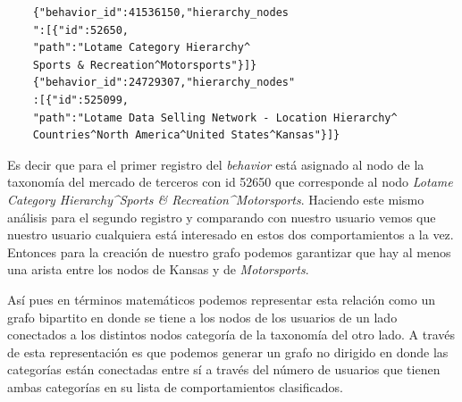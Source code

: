 \begin{verbatim}
    {"behavior_id":41536150,"hierarchy_nodes
    ":[{"id":52650,
    "path":"Lotame Category Hierarchy^
    Sports & Recreation^Motorsports"}]}
    {"behavior_id":24729307,"hierarchy_nodes"
    :[{"id":525099,
    "path":"Lotame Data Selling Network - Location Hierarchy^
    Countries^North America^United States^Kansas"}]}
\end{verbatim}

Es decir que para el primer registro del \textit{behavior} está asignado al nodo de la taxonomía del mercado de terceros con id 52650  que corresponde al nodo \textit{Lotame Category Hierarchy\textasciicircum Sports & Recreation\textasciicircum Motorsports}. Haciendo este mismo análisis para el segundo registro y comparando con nuestro usuario vemos que nuestro usuario cualquiera está interesado en estos dos comportamientos a la vez. Entonces para la creación de nuestro grafo podemos garantizar que hay al menos una arista entre los nodos de Kansas y de \textit{Motorsports}. 

Así pues en términos matemáticos podemos representar esta relación como  un grafo bipartito en donde se tiene a los nodos de los usuarios de un lado conectados a los distintos nodos categoría de la taxonomía del otro lado. A través de esta representación es que podemos generar un grafo no dirigido en donde las categorías están conectadas entre sí a través del número de usuarios que tienen ambas categorías en su lista de comportamientos clasificados.

